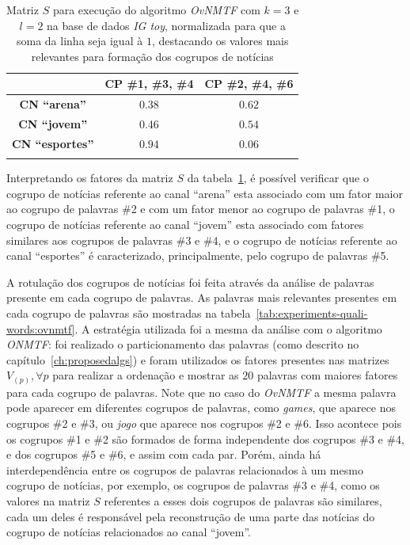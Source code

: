 \documentclass[
    12pt,                %
    oneside,            %
    a4paper,            %
    english,            %
    brazil                %
    ]{abntex2ppgsi}
\begin{document}
\begin{table}[H]
\centering
    \caption{Matriz $S$ para execução do algoritmo \textit{OvNMTF} com $k = 3$ e $l = 2$ na base de dados \textit{IG toy}, normalizada para que a soma da linha seja igual à $1$, destacando os valores mais relevantes para formação dos cogrupos de notícias}
    \begin{tabular}{ccc}
        \hline
        & \textbf{CP \#1, \#3, \#4} & \textbf{CP \#2, \#4, \#6} \\
        \hline
        \textbf{CN ``arena''}    & $\mathbf{0.38}$ & $\mathbf{0.62}$ \\
        \textbf{CN ``jovem''}    & $\mathbf{0.46}$ & $\mathbf{0.54}$ \\
        \textbf{CN ``esportes''} & $\mathbf{0.94}$ & $0.06$ \\
        \hline \\
    \end{tabular}
    \label{tab:ovnmtf:matrizS}
\end{table}

Interpretando os fatores da matriz $S$ da tabela~\ref{tab:ovnmtf:matrizS}, é possível verificar que o cogrupo de notícias referente ao canal ``arena'' esta associado com um fator maior ao cogrupo de palavras \#2 e com um fator menor ao cogrupo de palavras \#1, o cogrupo de notícias referente ao canal ``jovem'' esta associado com fatores similares aos cogrupos de palavras \#3 e \#4, e o cogrupo de notícias referente ao canal ``esportes'' é caracterizado, principalmente, pelo cogrupo de palavras \#5.

A rotulação dos cogrupos de notícias foi feita através da análise de palavras presente em cada cogrupo de palavras.
As palavras mais relevantes presentes em cada cogrupo de palavras são mostradas na tabela~\ref{tab:experiments-quali-words:ovnmtf}.
A estratégia utilizada foi a mesma da análise com o algoritmo \textit{ONMTF}: foi realizado o particionamento das palavras (como descrito no capítulo~\ref{ch:proposedalgs}) e foram utilizados os fatores presentes nas matrizes $V_{(p)}, \forall p$ para realizar a ordenação e mostrar as $20$ palavras com maiores fatores para cada cogrupo de palavras.
Note que no caso do \textit{OvNMTF} a mesma palavra pode aparecer em diferentes cogrupos de palavras, como \textit{games}, que aparece nos cogrupos \#2 e \#3, ou \textit{jogo} que aparece nos cogrupos \#2 e \#6.
Isso acontece pois os cogrupos \#1 e \#2 são formados de forma independente dos cogrupos \#3 e \#4, e dos cogrupos \#5 e \#6, e assim com cada par.
Porém, ainda há interdependência entre os cogrupos de palavras relacionados à um mesmo cogrupo de notícias, por exemplo, os cogrupos de palavras \#3 e \#4, como os valores na matriz $S$ referentes a esses dois cogrupos de palavras são similares, cada um deles é responsável pela reconstrução de uma parte das notícias do cogrupo de notícias relacionados ao canal ``jovem''.
\end{document}
